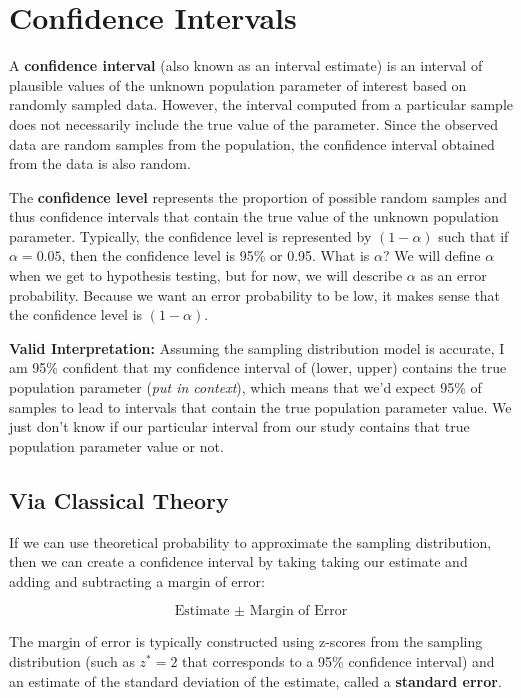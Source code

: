 \documentclass[]{book}
\begin{document}
\hypertarget{confidence-intervals}{%
\section{Confidence Intervals}\label{confidence-intervals}}

A \textbf{confidence interval} (also known as an interval estimate) is an interval of plausible values of the unknown population parameter of interest based on randomly sampled data. However, the interval computed from a particular sample does not necessarily include the true value of the parameter. Since the observed data are random samples from the population, the confidence interval obtained from the data is also random.

The \textbf{confidence level} represents the proportion of possible random samples and thus confidence intervals that contain the true value of the unknown population parameter. Typically, the confidence level is represented by \((1-\alpha)\) such that if \(\alpha = 0.05\), then the confidence level is 95\% or 0.95. What is \(\alpha\)? We will define \(\alpha\) when we get to hypothesis testing, but for now, we will describe \(\alpha\) as an error probability. Because we want an error probability to be low, it makes sense that the confidence level is \((1-\alpha)\).

\textbf{Valid Interpretation:} Assuming the sampling distribution model is accurate, I am 95\% confident that my confidence interval of (lower, upper) contains the true population parameter (\emph{put in context}), which means that we'd expect 95\% of samples to lead to intervals that contain the true population parameter value. We just don't know if our particular interval from our study contains that true population parameter value or not.

\hypertarget{via-classical-theory}{%
\subsection{Via Classical Theory}\label{via-classical-theory}}

If we can use theoretical probability to approximate the sampling distribution, then we can create a confidence interval by taking taking our estimate and adding and subtracting a margin of error:

\[\text{Estimate }\pm \text{ Margin of Error}\]

The margin of error is typically constructed using z-scores from the sampling distribution (such as \(z^* = 2\) that corresponds to a 95\% confidence interval) and an estimate of the standard deviation of the estimate, called a \textbf{standard error}.
\end{document}
